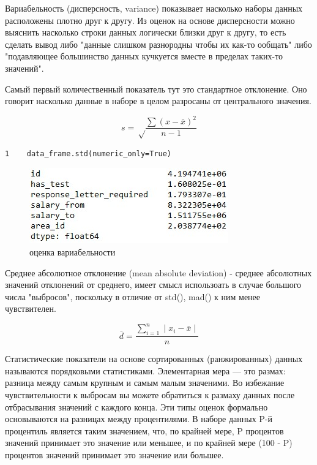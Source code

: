 \documentclass[12pt, a4paper]{article}
\begin{document}
{Вариабельность (дисперсность, variance) показывает насколько 
наборы данных расположены плотно друг к другу. Из оценок на 
основе дисперсности можно выяснить насколько строки данных 
логически близки друг к другу, то есть сделать вывод либо 
"данные слишком разнородны чтобы их как-то ообщать" либо 
"подавляющее большинство данных кучкуется вместе в пределах 
таких-то значений".

\vspace{1em}

Самый первый количественный показатель тут это стандартное 
отклонение. Оно говорит насколько данные в наборе в целом 
разросаны от центрального значения.

$$s = \sqrt\frac{\sum (x - \bar{x}) ^2}  {n-1} $$

\begin{verbatim}
1    data_frame.std(numeric_only=True)
\end{verbatim}

\begin{figure}[h]
    \begin{center}
        \includegraphics[scale=1,keepaspectratio]
        {Pictures/Picture_7.jpg}
        \caption{оценка вариабельности}
        \label{Picture_7}
    \end{center}
\end{figure}

Среднее абсолютное отклонение (mean absolute deviation) - 
среднее абсолютных значений отклонений от среднего, 
имеет смысл использоать в случае большого числа "выбросов", 
поскольку в отличие от std(), mad() к ним менее чувствителен.

$$\bar{d} = \frac{\sum_{i=1}^{n} \mid x_i - \bar{x} \mid }  {n} $$

Статистические показатели на основе сортированных (ранжированных) 
данных называются порядковыми статистиками. Элементарная мера — 
это размах: разница между самым крупным и самым малым значеними.
Во избежание чувствительности к выбросам вы можете обратиться к 
размаху данных после отбрасывания значений с каждого конца. Эти 
типы оценок формально основываются на разницах между 
процентилями. В наборе данных P-й процентиль является таким 
значением, что, по крайней мере, P процентов значений принимает 
это значение или меньшее, и по крайней мере (100 - P) процентов 
значений принимает это значение или большее.

}
\end{document}
